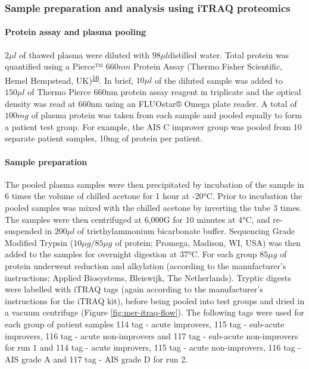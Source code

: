 \documentclass[
]{article}
\begin{document}
\hypertarget{itraq-sample-prep}{%
\subsubsection{Sample preparation and analysis using iTRAQ proteomics}\label{itraq-sample-prep}}

\hypertarget{protein-assay-and-plasma-pooling}{%
\paragraph{Protein assay and plasma pooling}\label{protein-assay-and-plasma-pooling}}

\(2\mu l\) of thawed plasma were diluted with \(98\mu l\)distilled water.
Total protein was quantified using a Pierce™ \(660 nm\) Protein Assay (Thermo Fisher Scientific, Hemel Hempstead, UK)\textsuperscript{\protect\hyperlink{ref-stoscheck_protein_1987}{16}}.
In brief, \(10\mu l\) of the diluted sample was added to \(150\mu l\) of Thermo Pierce 660nm protein assay reagent in triplicate and the optical density was read at 660nm using an FLUOstar® Omega plate reader.
A total of \(100 mg\) of plasma protein was taken from each sample and pooled equally to form a patient test group.
For example, the AIS C improver group was pooled from 10 separate patient samples, 10mg of protein per patient.

\hypertarget{sample-preparation}{%
\paragraph{Sample preparation}\label{sample-preparation}}

The pooled plasma samples were then precipitated by incubation of the sample in 6 times the volume of chilled acetone for 1 hour at -20°C.
Prior to incubation the pooled samples was mixed with the chilled acetone by inverting the tube 3 times.
The samples were then centrifuged at 6,000G for 10 minutes at 4°C, and re-suspended in \(200\mu l\) of triethylammonium bicarbonate buffer.
Sequencing Grade Modified Trypsin (\(10\mu g/85\mu g\) of protein; Promega, Madison, WI, USA) was then added to the samples for overnight digestion at 37°C.
For each group \(85\mu g\) of protein underwent reduction and alkylation (according to the manufacturer's instructions; Applied Biosystems, Bleiswijk, The Netherlands).
Tryptic digests were labelled with iTRAQ tags (again according to the manufacturer's instructions for the iTRAQ kit), before being pooled into test groups and dried in a vacuum centrifuge (Figure \ref{fig:mer-itraq-flow}).
The following tags were used for each group of patient samples 114 tag - acute improvers, 115 tag - sub-acute improvers, 116 tag - acute non-improvers and 117 tag - sub-acute non-improvers for run 1 and 114 tag - acute improvers, 115 tag - acute non-improvers, 116 tag - AIS grade A and 117 tag - AIS grade D for run 2.
\end{document}

